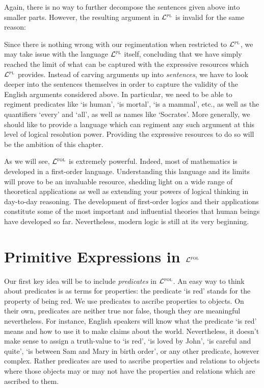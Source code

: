 Again, there is no way to further decompose the sentences given above into smaller parts.
However, the resulting argument in $\mathcal{L}^{\textsc{pl}}$ is invalid for the same reason:

\begin{earg}
\end{earg}

Since there is nothing wrong with our regimentation when restricted to $\mathcal{L}^{\textsc{pl}}$, we may take issue with the language $\mathcal{L}^{\textsc{pl}}$ itself, concluding that we have simply reached the limit of what can be captured with the expressive resources which $\mathcal{L}^{\textsc{pl}}$ provides.
Instead of carving arguments up into \textit{sentences}, we have to look deeper into the sentences themselves in order to capture the validity of the English arguments considered above.
In particular, we need to be able to regiment predicates like `is human', `is mortal', `is a mammal', etc., as well as the quantifiers `every' and `all', as well as names like `Socrates'.
More generally, we should like to provide a language which can regiment any such argument at this level of logical resolution power.
Providing the expressive resources to do so will be the ambition of this chapter.

As we will see, $\mathcal{L}^{\textsc{fol}}$ is extremely powerful.
Indeed, most of mathematics is developed in a first-order language.
Understanding this language and its limits will prove to be an invaluable resource, shedding light on a wide range of theoretical applications as well as extending your powers of logical thinking in day-to-day reasoning. 
The development of first-order logics and their applications constitute some of the most important and influential theories that human beings have developed so far.
Nevertheless, modern logic is still at its very beginning.





\section{Primitive Expressions in $\mathcal{L}^{\textsc{fol}}$}

Our first key idea will be to include \textit{predicates} in $\mathcal{L}^{\textsc{fol}}$.
An easy way to think about predicates is as terms for properties: the predicate `is red' stands for the property of being red.
We use predicates to ascribe properties to objects.
On their own, predicates are neither true nor false, though they are meaningful nevertheless.
For instance, English speakers will know what the predicate `is red' means and how to use it to make claims about the world.
Nevertheless, it doesn't make sense to assign a truth-value to `is red', `is loved by John', `is careful and quite', `is between Sam and Mary in birth order', or any other predicate, however complex.
Rather predicates are used to ascribe properties and relations to objects where those objects may or may not have the properties and relations which are ascribed to them.


